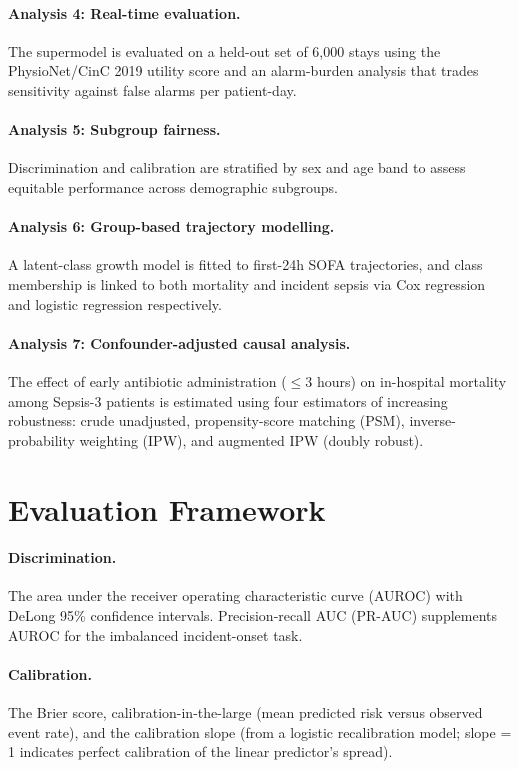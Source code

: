 \paragraph{Analysis 4: Real-time evaluation.}
The supermodel is evaluated on a held-out set of 6{,}000 stays using the
PhysioNet/CinC 2019 utility score and an alarm-burden analysis that trades
sensitivity against false alarms per patient-day.

\paragraph{Analysis 5: Subgroup fairness.}
Discrimination and calibration are stratified by sex and age band to assess
equitable performance across demographic subgroups.

\paragraph{Analysis 6: Group-based trajectory modelling.}
A latent-class growth model is fitted to first-24h SOFA trajectories, and
class membership is linked to both mortality and incident sepsis via Cox
regression and logistic regression respectively.

\paragraph{Analysis 7: Confounder-adjusted causal analysis.}
The effect of early antibiotic administration ($\le 3$ hours) on in-hospital
mortality among Sepsis-3 patients is estimated using four estimators of
increasing robustness: crude unadjusted, propensity-score matching (PSM),
inverse-probability weighting (IPW), and augmented IPW (doubly robust).

\section{Evaluation Framework}
\label{sec:eval_framework}

\paragraph{Discrimination.} The area under the receiver operating
characteristic curve (AUROC) with DeLong 95\% confidence intervals.
Precision-recall AUC (PR-AUC) supplements AUROC for the imbalanced
incident-onset task.

\paragraph{Calibration.} The Brier score, calibration-in-the-large (mean
predicted risk versus observed event rate), and the calibration slope (from a
logistic recalibration model; slope = 1 indicates perfect calibration of the
linear predictor's spread).

